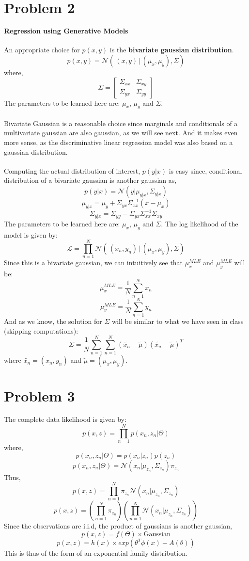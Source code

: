 \documentclass{article}
\begin{document}
\section*{Problem 2}
\textbf{Regression using Generative Models} \\ \\
An appropriate choice for $p(x,y)$ is the \textbf{bivariate gaussian distribution}.
$$p(x,y) = \mathcal{N}(\hspace{2pt} (x,y)\hspace{2pt} | \hspace{2pt} (\mu_x,\mu_y), \Sigma)$$
where,
\[
\Sigma=
  \begin{bmatrix}
    \Sigma_{xx} & \Sigma_{xy}  \\
    \Sigma_{yx} & \Sigma_{yy} 
  \end{bmatrix}
\]
The parameters to be learned here are: $\mu_x$, $\mu_y$ and $\Sigma$. \\ \\
Bivariate Gaussian is a reasonable choice since marginals and conditionals of a multivariate gaussian are also gaussian, as we will see next. And it makes even more sense, as the discriminative linear regression model was also based on a gaussian distribution. \\ \\
Computing the actual distribution of interest, $p(y|x)$ is easy since, conditional distribution of a bivariate gaussian is another gaussian as,
$$p(y|x) = \mathcal{N}(y|\mu_{y|x}, \Sigma_{y|x})$$
$$\mu_{y|x} = \mu_y + \Sigma_{yx}\Sigma_{xx}^{-1}(x-\mu_x)$$
$$\Sigma_{y|x} = \Sigma_{yy} - \Sigma_{yx}\Sigma_{xx}^{-1}\Sigma_{xy}$$
The parameters to be learned here are: $\mu_x$, $\mu_y$ and $\Sigma$.
The log likelihood of the model is given by:
$$\mathcal{L} = \prod_{n=1}^N\mathcal{N}(\hspace{2pt} (x_n,y_n)\hspace{2pt} | \hspace{2pt} (\mu_x,\mu_y), \Sigma)$$
Since this is a bivariate gaussian, we can intuitively see that $\mu_x^{MLE}$ and $\mu_y^{MLE}$ will be:
$$\mu_x^{MLE} = \frac{1}{N}\sum_{n=1}^Nx_n$$
$$\mu_y^{MLE} = \frac{1}{N}\sum_{n=1}^Ny_n$$
And as we know, the solution for $\Sigma$ will be similar to what we have seen in class (skipping computations):
$$\Sigma = \frac{1}{N}\sum_{n=1}^N \sum_{n=1}^N (\tilde{x_n}-\tilde{\mu})(\tilde{x_n}-\tilde{\mu})^T$$
where $\tilde{x_n} = (x_n,y_n)$ and $\tilde{\mu} = (\mu_x, \mu_y)$.
\section*{Problem 3}
The complete data likelihood is given by:
$$p(x,z) = \prod_{n=1}^Np(x_n,z_n|\Theta)$$
where,
$$p(x_n, z_n|\Theta) = p(x_n|z_n)p(z_n)$$	
$$p(x_n, z_n|\Theta) = \mathcal{N}(x_n|\mu_{z_n}, \Sigma_{z_n})\pi_{z_n}$$	
Thus, 
$$p(x,z) = \prod_{n=1}^N\pi_{z_n}\mathcal{N}(x_n|\mu_{z_n}, \Sigma_{z_n})$$
$$p(x,z) = ( \prod_{n=1}^N\pi_{z_n})(\prod_{n=1}^{N}\mathcal{N}(x_n|\mu_{z_n}, \Sigma_{z_n}))$$
Since the observations are i.i.d, the product of gaussians is another gaussian, 
$$p(x,z) = f(\Theta) \times \text{Gaussian}$$
$$p(x,z) = h(x) \times exp(\theta^T \phi(x) - A(\theta))$$
This is thus of the form of an exponential family distribution.
\end{document}
